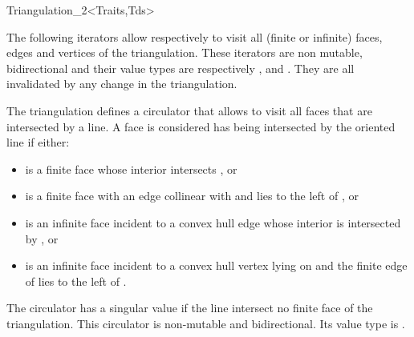 \begin{ccRefClass}{Triangulation_2<Traits,Tds>}
\ccGlue
{}
\ccGlue
{}
\ccGlue
{}

The following iterators allow respectively to visit all
(finite or infinite) faces, edges and vertices
of the triangulation. These iterators are non mutable, bidirectional
and their value types are respectively
,  and . 
They are all invalidated by any change in the triangulation.


\ccGlue
{}

\ccGlue
{}

\ccGlue
{}


The triangulation defines a circulator that allows
to visit all faces that are intersected by a line. 
A  face   is 
considered has being intersected by 
 the oriented line  if either:
\begin{itemize}\ccTexHtml{\itemsep0pt}{}
\item 
{} is a finite face whose interior intersects , or
\item
  is a finite face with  an edge collinear with  and lies
to the left of , or
\item
{} is an infinite face incident to a  convex hull edge 
whose interior is intersected
by , or
\item
{} is an infinite face incident to a  convex hull vertex
lying on   and the finite edge of 
lies to the left of . 
\end{itemize}
The circulator has a singular value if  the line 
intersect no finite face of the triangulation.
This circulator is
non-mutable and bidirectional. Its value type is .


\end{ccRefClass}
